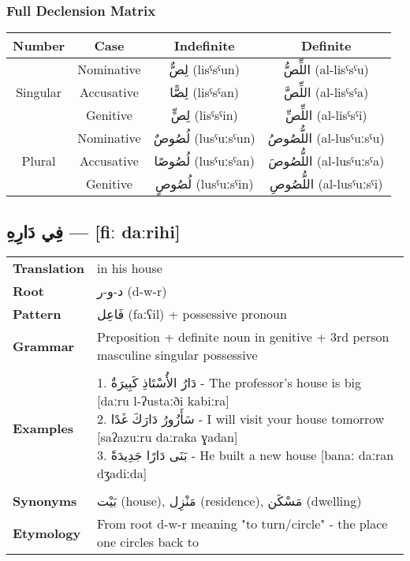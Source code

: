 \documentclass[letter,12pt]{article}
\begin{document}
\subsubsection*{Full Declension Matrix}
\begin{tabular}{|c|c|c|c|}
\hline
\textbf{Number} & \textbf{Case} & \textbf{Indefinite} & \textbf{Definite} \\
\hline
\multirow{3}{*}{Singular}
 & Nominative   & \textarabic{لِصٌّ} (lisˤsˤun) & \textarabic{اللِّصُّ} (al-lisˤsˤu) \\
 & Accusative   & \textarabic{لِصًّا} (lisˤsˤan) & \textarabic{اللِّصَّ} (al-lisˤsˤa) \\
 & Genitive     & \textarabic{لِصٍّ} (lisˤsˤin) & \textarabic{اللِّصِّ} (al-lisˤsˤi) \\
\hline
\multirow{3}{*}{Plural}
 & Nominative   & \textarabic{لُصُوصٌ} (lusˤuːsˤun) & \textarabic{اللُّصُوصُ} (al-lusˤuːsˤu) \\
 & Accusative   & \textarabic{لُصُوصًا} (lusˤuːsˤan) & \textarabic{اللُّصُوصَ} (al-lusˤuːsˤa) \\
 & Genitive     & \textarabic{لُصُوصٍ} (lusˤuːsˤin) & \textarabic{اللُّصُوصِ} (al-lusˤuːsˤi) \\
\hline
\end{tabular}

\subsection{\textarabic{فِي دَارِهِ} — [fiː daːrihi]}
\begin{tabular}{p{3cm}p{10cm}}
\toprule
\textbf{Translation} & in his house \\
\textbf{Root} & \textarabic{د-و-ر} (d-w-r) \\
\textbf{Pattern} & \textarabic{فَاعِل} (faːʕil) + possessive pronoun \\
\textbf{Grammar} & Preposition + definite noun in genitive + 3rd person masculine singular possessive \\
\midrule \\
\textbf{Examples} & \makecell[l]{\parbox{9.5cm}{
1. \textarabic{دَارُ الأُسْتَاذِ كَبِيرَةٌ} - The professor's house is big [daːru l-ʔustaːði kabiːra]\\
2. \textarabic{سَأَزُورُ دَارَكَ غَدًا} - I will visit your house tomorrow [saʔazuːru daːraka ɣadan]\\
3. \textarabic{بَنَى دَارًا جَدِيدَةً} - He built a new house [banaː daːran dʒadiːda]
}} \\
\midrule \\
\textbf{Synonyms} & \textarabic{بَيْت} (house), \textarabic{مَنْزِل} (residence), \textarabic{مَسْكَن} (dwelling) \\
\textbf{Etymology} & From root d-w-r meaning "to turn/circle" - the place one circles back to \\
\bottomrule
\end{tabular}
\end{document}
